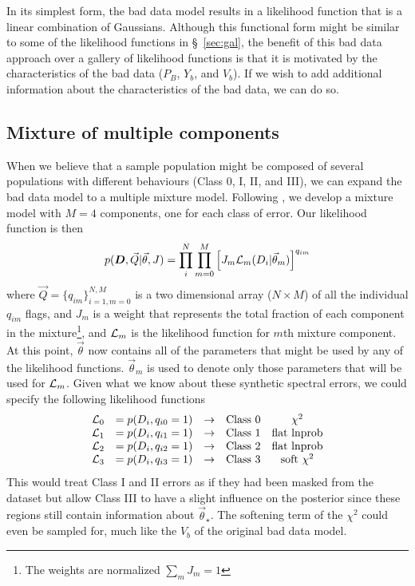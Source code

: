 \documentclass[preprint]{aastex} %
\newcommand{\qM}{\{q_{im}\}_{i=1,m=0}^{N,M}}
\newcommand{\vt}{\vec{\theta}}
\newcommand{\vstar}{\vt_{\star}}
\newcommand{\fD}{ {\bm D}}
\newcommand{\fDi}{D_i}
\begin{document}
In its simplest form, the bad data model results in a likelihood function that is a linear combination of Gaussians. Although this functional form might be similar to some of the likelihood functions in \S~\ref{sec:gal}, the benefit of this bad data approach over a gallery of likelihood functions is that it is motivated by the characteristics of the bad data ($P_B$, $Y_b$, and $V_b$). If we wish to add additional information about the characteristics of the bad data, we can do so. 

\subsection{Mixture of multiple components}
When we believe that a sample population might be composed of several populations with different behaviours (Class 0, I, II, and III), we can expand the bad data model to a multiple mixture model. Following \citet{gcs+04}, we develop a mixture model with $M=4$ components, one for each class of error. Our likelihood function is then
\begin{equation}
  p(\fD, \vec{Q} | \vt, J) = \prod_i^N \prod_{m=0}^M \left [ J_m {\cal L}_m(\fDi | \vt_m) \right ]^{q_{im}}
\end{equation}
where $\vec{Q} = \qM$ is a two dimensional array ($N \times M$) of all the individual $q_{im}$ flags, and $J_m$ is a weight that represents the total fraction of each component in the mixture\footnote{The weights are normalized $\sum_m J_m = 1$}, and ${\cal L}_m$ is the likelihood function for $m$th mixture component. At this point, $\vt$ now contains all of the parameters that might be used by any of the likelihood functions. $\vt_m$ is used to denote only those parameters that will be used for ${\cal L}_m$. Given what we know about these synthetic spectral errors, we could specify the following likelihood functions
\begin{equation}
  \begin{array}{lcccc}
 {\cal L}_0 &= p(\fDi, q_{i0} = 1) &\rightarrow & \textrm{Class 0} & \chi^2\\
 {\cal L}_1 &= p(\fDi, q_{i1} = 1) &\rightarrow & \textrm{Class 1} & \textrm{flat lnprob}\\
 {\cal L}_2 &= p(\fDi, q_{i2} = 1) &\rightarrow & \textrm{Class 2} & \textrm{flat lnprob}\\
 {\cal L}_3 &= p(\fDi, q_{i3} = 1) &\rightarrow & \textrm{Class 3} & \textrm{soft } \chi^2\\
\end{array}
\end{equation}
This would treat Class I and II errors as if they had been masked from the dataset but allow Class III to have a slight influence on the posterior since these regions still contain information about $\vstar$. The softening term of the $\chi^2$ could even be sampled for, much like the $V_b$ of the original bad data model.
\end{document}
